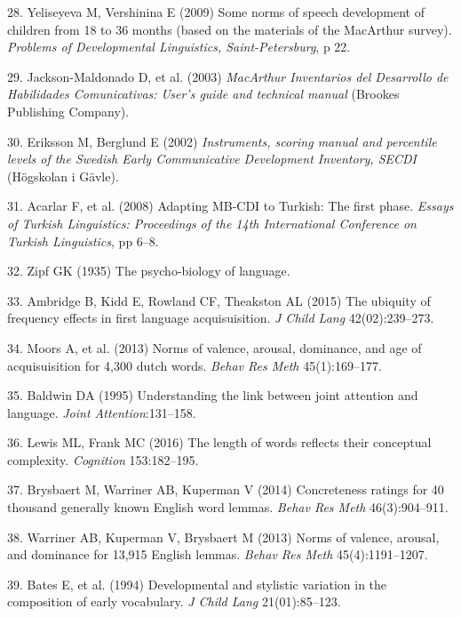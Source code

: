 \documentclass[english,man]{apa6}
\theoremstyle{definition}
\theoremstyle{definition}
\theoremstyle{definition}
\theoremstyle{remark}
\begin{document}
\hypertarget{ref-yeliseyeva2009}{}
28. Yeliseyeva M, Vershinina E (2009) Some norms of speech development
of children from 18 to 36 months (based on the materials of the
MacArthur survey). \emph{Problems of Developmental Linguistics,
Saint-Petersburg}, p 22.

\hypertarget{ref-fenson2003}{}
29. Jackson-Maldonado D, et al. (2003) \emph{MacArthur Inventarios del
Desarrollo de Habilidades Comunicativas: User's guide and technical
manual} (Brookes Publishing Company).

\hypertarget{ref-eriksson2002}{}
30. Eriksson M, Berglund E (2002) \emph{Instruments, scoring manual and
percentile levels of the Swedish Early Communicative Development
Inventory, SECDI} (Högskolan i Gävle).

\hypertarget{ref-acarlar2008}{}
31. Acarlar F, et al. (2008) Adapting MB-CDI to Turkish: The first
phase. \emph{Essays of Turkish Linguistics: Proceedings of the 14th
International Conference on Turkish Linguistics}, pp 6--8.

\hypertarget{ref-zipf1935}{}
32. Zipf GK (1935) The psycho-biology of language.

\hypertarget{ref-ambridge2015}{}
33. Ambridge B, Kidd E, Rowland CF, Theakston AL (2015) The ubiquity of
frequency effects in first language acquisuisition. \emph{J Child Lang}
42(02):239--273.

\hypertarget{ref-moors2013}{}
34. Moors A, et al. (2013) Norms of valence, arousal, dominance, and age
of acquisuisition for 4,300 dutch words. \emph{Behav Res Meth}
45(1):169--177.

\hypertarget{ref-baldwin1995}{}
35. Baldwin DA (1995) Understanding the link between joint attention and
language. \emph{Joint Attention}:131--158.

\hypertarget{ref-lewis2016}{}
36. Lewis ML, Frank MC (2016) The length of words reflects their
conceptual complexity. \emph{Cognition} 153:182--195.

\hypertarget{ref-brysbaert2014}{}
37. Brysbaert M, Warriner AB, Kuperman V (2014) Concreteness ratings for
40 thousand generally known English word lemmas. \emph{Behav Res Meth}
46(3):904--911.

\hypertarget{ref-warriner2013}{}
38. Warriner AB, Kuperman V, Brysbaert M (2013) Norms of valence,
arousal, and dominance for 13,915 English lemmas. \emph{Behav Res Meth}
45(4):1191--1207.

\hypertarget{ref-bates1994}{}
39. Bates E, et al. (1994) Developmental and stylistic variation in the
composition of early vocabulary. \emph{J Child Lang} 21(01):85--123.
\end{document}

